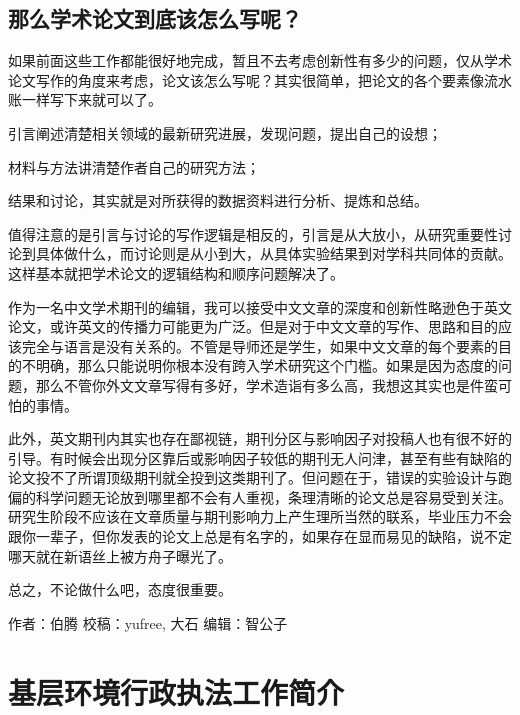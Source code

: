 \documentclass[]{book}
\begin{document}
\hypertarget{ux90a3ux4e48ux5b66ux672fux8bbaux6587ux5230ux5e95ux8be5ux600eux4e48ux5199ux5462}{%
\subsection{那么学术论文到底该怎么写呢？}\label{ux90a3ux4e48ux5b66ux672fux8bbaux6587ux5230ux5e95ux8be5ux600eux4e48ux5199ux5462}}

如果前面这些工作都能很好地完成，暂且不去考虑创新性有多少的问题，仅从学术论文写作的角度来考虑，论文该怎么写呢？其实很简单，把论文的各个要素像流水账一样写下来就可以了。

引言阐述清楚相关领域的最新研究进展，发现问题，提出自己的设想；

材料与方法讲清楚作者自己的研究方法；

结果和讨论，其实就是对所获得的数据资料进行分析、提炼和总结。

值得注意的是引言与讨论的写作逻辑是相反的，引言是从大放小，从研究重要性讨论到具体做什么，而讨论则是从小到大，从具体实验结果到对学科共同体的贡献。这样基本就把学术论文的逻辑结构和顺序问题解决了。

作为一名中文学术期刊的编辑，我可以接受中文文章的深度和创新性略逊色于英文论文，或许英文的传播力可能更为广泛。但是对于中文文章的写作、思路和目的应该完全与语言是没有关系的。不管是导师还是学生，如果中文文章的每个要素的目的不明确，那么只能说明你根本没有跨入学术研究这个门槛。如果是因为态度的问题，那么不管你外文文章写得有多好，学术造诣有多么高，我想这其实也是件蛮可怕的事情。

此外，英文期刊内其实也存在鄙视链，期刊分区与影响因子对投稿人也有很不好的引导。有时候会出现分区靠后或影响因子较低的期刊无人问津，甚至有些有缺陷的论文投不了所谓顶级期刊就全投到这类期刊了。但问题在于，错误的实验设计与跑偏的科学问题无论放到哪里都不会有人重视，条理清晰的论文总是容易受到关注。研究生阶段不应该在文章质量与期刊影响力上产生理所当然的联系，毕业压力不会跟你一辈子，但你发表的论文上总是有名字的，如果存在显而易见的缺陷，说不定哪天就在新语丝上被方舟子曝光了。

总之，不论做什么吧，态度很重要。

作者：伯腾
校稿：yufree, 大石
编辑：智公子

\hypertarget{ux57faux5c42ux73afux5883ux884cux653fux6267ux6cd5ux5de5ux4f5cux7b80ux4ecb}{%
\section{基层环境行政执法工作简介}\label{ux57faux5c42ux73afux5883ux884cux653fux6267ux6cd5ux5de5ux4f5cux7b80ux4ecb}}
\end{document}
